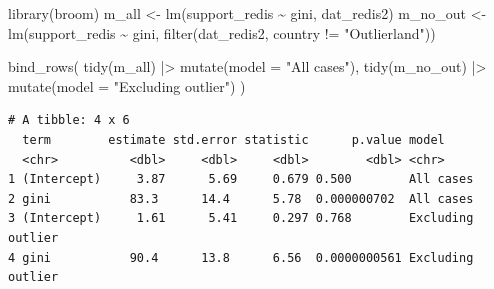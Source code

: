\documentclass[
  letterpaper,
  DIV=11,
  numbers=noendperiod]{scrreprt}
\newenvironment{Shaded}{\begin{snugshade}}{\end{snugshade}}
\newcommand{\AttributeTok}[1]{\textcolor[rgb]{0.40,0.45,0.13}{#1}}
\newcommand{\FunctionTok}[1]{\textcolor[rgb]{0.28,0.35,0.67}{#1}}
\newcommand{\NormalTok}[1]{\textcolor[rgb]{0.00,0.23,0.31}{#1}}
\newcommand{\OtherTok}[1]{\textcolor[rgb]{0.00,0.23,0.31}{#1}}
\newcommand{\SpecialCharTok}[1]{\textcolor[rgb]{0.37,0.37,0.37}{#1}}
\newcommand{\StringTok}[1]{\textcolor[rgb]{0.13,0.47,0.30}{#1}}
\begin{document}
\begin{Shaded}
\begin{Highlighting}[]
\FunctionTok{library}\NormalTok{(broom)}
\NormalTok{m\_all }\OtherTok{\textless{}{-}} \FunctionTok{lm}\NormalTok{(support\_redis }\SpecialCharTok{\textasciitilde{}}\NormalTok{ gini, dat\_redis2)}
\NormalTok{m\_no\_out }\OtherTok{\textless{}{-}} \FunctionTok{lm}\NormalTok{(support\_redis }\SpecialCharTok{\textasciitilde{}}\NormalTok{ gini, }\FunctionTok{filter}\NormalTok{(dat\_redis2, country }\SpecialCharTok{!=} \StringTok{"Outlierland"}\NormalTok{))}

\FunctionTok{bind\_rows}\NormalTok{(}
  \FunctionTok{tidy}\NormalTok{(m\_all) }\SpecialCharTok{|\textgreater{}} \FunctionTok{mutate}\NormalTok{(}\AttributeTok{model =} \StringTok{"All cases"}\NormalTok{),}
  \FunctionTok{tidy}\NormalTok{(m\_no\_out) }\SpecialCharTok{|\textgreater{}} \FunctionTok{mutate}\NormalTok{(}\AttributeTok{model =} \StringTok{"Excluding outlier"}\NormalTok{)}
\NormalTok{)}
\end{Highlighting}
\end{Shaded}

\begin{verbatim}
# A tibble: 4 x 6
  term        estimate std.error statistic      p.value model            
  <chr>          <dbl>     <dbl>     <dbl>        <dbl> <chr>            
1 (Intercept)     3.87      5.69     0.679 0.500        All cases        
2 gini           83.3      14.4      5.78  0.000000702  All cases        
3 (Intercept)     1.61      5.41     0.297 0.768        Excluding outlier
4 gini           90.4      13.8      6.56  0.0000000561 Excluding outlier
\end{verbatim}
\end{document}
